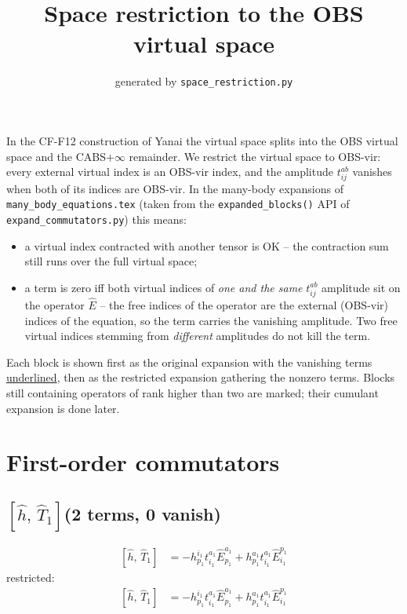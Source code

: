 \documentclass[11pt]{article}
\title{Space restriction to the OBS virtual space}
\date{generated by \texttt{space\_restriction.py}}
\begin{document}
\maketitle

In the CF-F12 construction of Yanai the virtual space splits into the OBS virtual space and the CABS$+\infty$ remainder.  We restrict the virtual space to OBS-vir: every external virtual index is an OBS-vir index, and the amplitude $t^{ab}_{ij}$ vanishes when both of its indices are OBS-vir.  In the many-body expansions of \texttt{many\_body\_equations.tex} (taken from the \texttt{expanded\_blocks()} API of \texttt{expand\_commutators.py}) this means:
\begin{itemize}
\item a virtual index contracted with another tensor is OK -- the contraction sum still runs over the full virtual space;
\item a term is zero iff both virtual indices of \emph{one and the same} $t^{ab}_{ij}$ amplitude sit on the operator $\hat{E}$ -- the free indices of the operator are the external (OBS-vir) indices of the equation, so the term carries the vanishing amplitude.  Two free virtual indices stemming from \emph{different} amplitudes do not kill the term.
\end{itemize}
Each block is shown first as the original expansion with the vanishing terms \underline{underlined}, then as the restricted expansion gathering the nonzero terms.  Blocks still containing operators of rank higher than two are marked; their cumulant expansion is done later.

\section{First-order commutators}
\subsection*{$\left[\hat{h},\, \hat{T}_{1}\right]$\quad(2 terms, 0 vanish)}
\begin{align}
\left[\hat{h},\, \hat{T}_{1}\right] &= - h^{i_{1}}_{p_{1}} t^{a_{1}}_{i_{1}} \hat{E}^{a_{1}}_{p_{1}} + h^{a_{1}}_{p_{1}} t^{a_{1}}_{i_{1}} \hat{E}^{p_{1}}_{i_{1}}
\end{align}
restricted:
\begin{align}
\left[\hat{h},\, \hat{T}_{1}\right] &= - h^{i_{1}}_{p_{1}} t^{a_{1}}_{i_{1}} \hat{E}^{a_{1}}_{p_{1}} + h^{a_{1}}_{p_{1}} t^{a_{1}}_{i_{1}} \hat{E}^{p_{1}}_{i_{1}}
\end{align}
\end{document}
